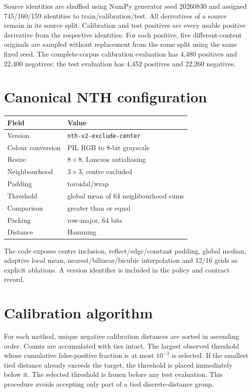 \documentclass[11pt]{article}
\begin{document}
Source identities are shuffled using NumPy generator seed 20260830 and assigned 745/160/159 identities to train/calibration/test. All derivatives of a source remain in its source split. Calibration and test positives are every usable positive derivative from the respective identities. For each positive, five different-content originals are sampled without replacement from the same split using the same fixed seed. The complete-corpus calibration evaluation has 4,480 positives and 22,400 negatives; the test evaluation has 4,452 positives and 22,260 negatives.

\section{Canonical NTH configuration}

\begin{longtable}{ll}
\toprule
Field & Value\\
\midrule
Version & \texttt{nth-v2-exclude-center}\\
Colour conversion & PIL RGB to 8-bit grayscale\\
Resize & $8\times8$, Lanczos antialiasing\\
Neighbourhood & $3\times3$, centre excluded\\
Padding & toroidal/wrap\\
Threshold & global mean of 64 neighbourhood sums\\
Comparison & greater than or equal\\
Packing & row-major, 64 bits\\
Distance & Hamming\\
\bottomrule
\end{longtable}

The code exposes centre inclusion, reflect/edge/constant padding, global median, adaptive local mean, nearest/bilinear/bicubic interpolation and 12/16 grids as explicit ablations. A version identifier is included in the policy and contract record.

\section{Calibration algorithm}

For each method, unique negative calibration distances are sorted in ascending order. Counts are accumulated with ties intact. The largest observed threshold whose cumulative false-positive fraction is at most $10^{-3}$ is selected. If the smallest tied distance already exceeds the target, the threshold is placed immediately below it. The selected threshold is frozen before any test evaluation. This procedure avoids accepting only part of a tied discrete-distance group.
\end{document}
